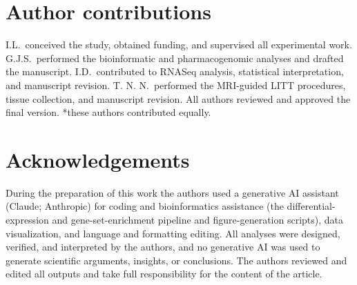 \documentclass[unnumsec,webpdf,contemporary,large]{oup-authoring-template}
\begin{document}
\section*{Author contributions}
I.L.\ conceived the study, obtained funding, and supervised all experimental work. G.J.S.\ performed the bioinformatic and pharmacogenomic analyses and drafted the manuscript. I.D.\ contributed to RNASeq analysis, statistical interpretation, and manuscript revision. T. N. N.\ performed the MRI-guided LITT procedures, tissue collection, and manuscript revision. All authors reviewed and approved the final version. *these authors contributed equally.

\section*{Acknowledgements}
During the preparation of this work the authors used a generative AI assistant (Claude; Anthropic) for coding and bioinformatics assistance (the differential-expression and gene-set-enrichment pipeline and figure-generation scripts), data visualization, and language and formatting editing. All analyses were designed, verified, and interpreted by the authors, and no generative AI was used to generate scientific arguments, insights, or conclusions. The authors reviewed and edited all outputs and take full responsibility for the content of the article.
\end{document}
